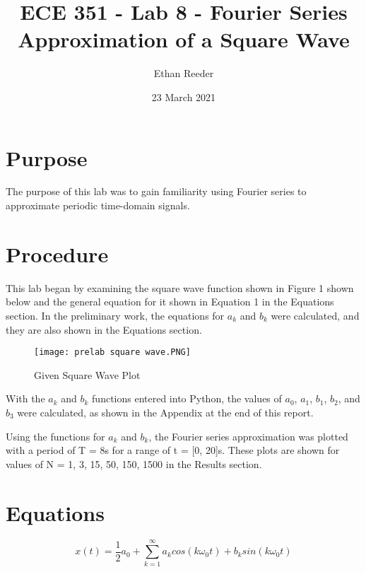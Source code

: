 \documentclass[12pt]{article}
\title{ECE 351 - Lab 8 - Fourier Series Approximation of a Square Wave}
\author{Ethan Reeder}
\date{23 March 2021}
\begin{document}
\lstset{language=Python}

\maketitle

\newpage

\tableofcontents

\newpage

\section{Purpose}

The purpose of this lab was to gain familiarity using Fourier series to approximate periodic time-domain signals.

\section{Procedure}

This lab began by examining the square wave function shown in Figure 1 shown below and the general equation for it shown in Equation 1 in the Equations section. In the preliminary work, the equations for $a_k$ and $b_k$ were calculated, and they are also shown in the Equations section.


\begin{figure}[h!]
    \centering
    \texttt{[image: prelab square wave.PNG]}
    \caption{Given Square Wave Plot}
\end{figure}


With the $a_k$ and $b_k$ functions entered into Python, the values of $a_0$, $a_1$, $b_1$, $b_2$, and $b_3$ were calculated, as shown in the Appendix at the end of this report.


Using the functions for $a_k$ and $b_k$, the Fourier series approximation was plotted with a period of T = 8s for a range of t = [0, 20]s. These plots are shown for values of N = {1, 3, 15, 50, 150, 1500} in the Results section.

\section{Equations}

\begin{equation}
    x(t) = \frac{1}{2}a_0 + \sum_{k=1}^{\infty} a_k cos(k \omega_0 t) +  b_k sin(k \omega_0 t)
\end{equation}
\end{document}
